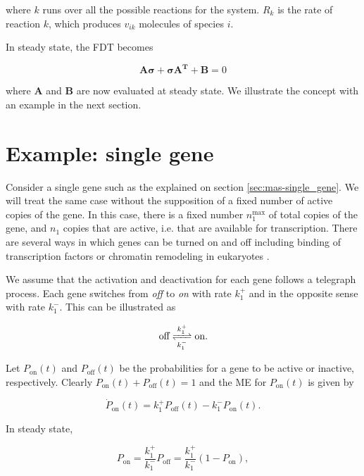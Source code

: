where $k$ runs over all the possible reactions for the system. $R_k$ is the rate of reaction $k$, which produces $v_{ik}$ molecules of species $i$.

In steady state, the FDT becomes

\begin{equation}
  \label{eq:fdt-fdtss}
  \mathbf{A\sigma}+\mathbf{\sigma A^T}+\mathbf{B} = 0
\end{equation}

where $\mathbf{A}$ and $\mathbf{B}$ are now evaluated at steady state. We illustrate the concept with an example in the next section.

\section{Example: single gene}

Consider a single gene such as the explained on section \ref{sec:mas-single_gene}. We will treat the same case without the supposition of a fixed number of active copies of the gene. In this case, there is a fixed number $n_1^{\text{max}}$ of total copies of the gene, and $n_1$ copies that are active, i.e. that are available for transcription. There are several ways in which genes can be turned on and off including binding of transcription factors or chromatin remodeling in eukaryotes \cite{paulsson05}.

We assume that the activation and deactivation for each gene follows a telegraph process. Each gene switches from \textit{off} to \textit{on} with rate $k_1^+$ and in the opposite sense with rate $k_1^-$. This can be illustrated as

\begin{equation*}
  \text{off}\ce{<=>[k_1^+][k_1^-]}\text{on}.
\end{equation*}

Let $P_\text{on}(t)$ and $P_\text{off}(t)$ be the probabilities for a gene to be active or inactive, respectively. Clearly $P_\text{on}(t) + P_\text{off}(t) = 1$ and the ME for $P_\text{on}(t)$ is given by

\begin{equation*}
  \dot{P}_\text{on}(t)=k_1^+P_\text{off}(t)-k_1^-P_\text{on}(t).
\end{equation*}

In steady state,

\begin{equation*}
  P_\text{on} = \frac{k_1^+}{k_1^-}P_\text{off} = \frac{k_1^+}{k_1^-}(1-P_\text{on}),
\end{equation*}

